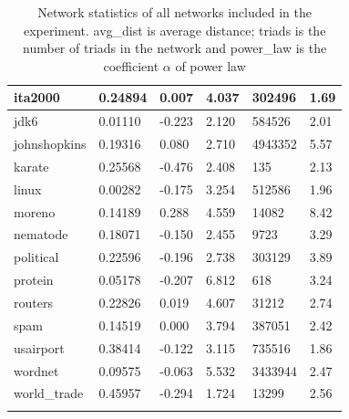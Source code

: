 \begin{longtable}[c]{|l|l|l|l|l|l|}
			ita2000             & 0.24894               & 0.007                  & 4.037              & 302496          & 1.69                \\ \hline
			jdk6                & 0.01110               & -0.223                 & 2.120              & 584526          & 2.01                \\ \hline
			johnshopkins        & 0.19316               & 0.080                  & 2.710              & 4943352         & 5.57                \\ \hline
			karate              & 0.25568               & -0.476                 & 2.408              & 135             & 2.13                \\ \hline
			linux               & 0.00282               & -0.175                 & 3.254              & 512586          & 1.96                \\ \hline
			moreno              & 0.14189               & 0.288                  & 4.559              & 14082           & 8.42                \\ \hline
			nematode            & 0.18071               & -0.150                 & 2.455              & 9723            & 3.29                \\ \hline
			political           & 0.22596               & -0.196                 & 2.738              & 303129          & 3.89                \\ \hline
			protein             & 0.05178               & -0.207                 & 6.812              & 618             & 3.24                \\ \hline
			routers             & 0.22826               & 0.019                  & 4.607              & 31212           & 2.74                \\ \hline
			spam                & 0.14519               & 0.000                  & 3.794              & 387051          & 2.42                \\ \hline
			usairport           & 0.38414               & -0.122                 & 3.115              & 735516          & 1.86                \\ \hline
			wordnet             & 0.09575               & -0.063                 & 5.532              & 3433944         & 2.47                \\ \hline
			world\_trade        & 0.45957               & -0.294                 & 1.724              & 13299           & 2.56                \\ \hline
			\caption{Network statistics of all networks included in the experiment. avg\_dist is average distance; triads is the number of triads in the network and power\_law is the coefficient $\alpha$ of power law}
			\label{tab:inf-framework-network-stats-b}\\
		\end{longtable}
	
